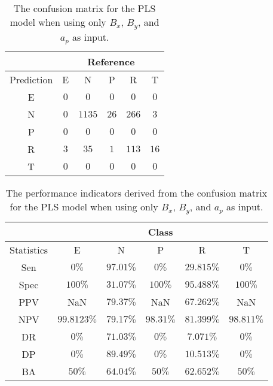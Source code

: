 \begin{table}[!ht]
	\centering
	\begin{tabular}{|c|c|c|c|c|c|}
		\hline
		 & \multicolumn{5}{|c|}{Reference} \\ \hline
		 Prediction & E & N & P & R & T \\ \hline
		 E & $0$ & $0$ & $0$ & $0$ & $0$ \\ \hline
		 N & $0$ & $1135$ & $26$ & $266$ & $3$ \\ \hline
		 P & $0$ & $0$ & $0$ & $0$ & $0$ \\ \hline
		 R & $3$ & $35$ & $1$ & $113$ & $16$ \\ \hline
		 T & $0$ & $0$ & $0$ & $0$ & $0$ \\ \hline
	\end{tabular}
	\caption{The confusion matrix for the PLS model when using only $B_{x}$, $B_{y}$, and $a_{p}$ as input.}
	\label{tab:cm:xyap:pls}
\end{table}

\begin{table}[!ht]
	\centering
	\begin{tabular}{|c|c|c|c|c|c|}
		\hline
		 & \multicolumn{5}{c|}{Class} \\ \hline
		Statistics & E & N & P & R & T \\ \hline
		Sen & $0\%$ & $97.01\%$ & $0\%$ & $29.815\%$ & $0\%$ \\ \hline
		Spec & $100\%$ & $31.07\%$ & $100\%$ & $95.488\%$ & $100\%$ \\ \hline
		PPV & NaN & $79.37\%$ & NaN & $67.262\%$ & NaN \\ \hline
		NPV & $99.8123\%$ & $79.17\%$ & $98.31\%$ & $81.399\%$ & $98.811\%$ \\ \hline
		DR & $0\%$ & $71.03\%$ & $0\%$ & $7.071\%$ & $0\%$ \\ \hline
		DP & $0\%$ & $89.49\%$ & $0\%$ & $10.513\%$ & $0\%$ \\ \hline
		BA & $50\%$ & $64.04\%$ & $50\%$ & $62.652\%$ & $50\%$ \\ \hline
	\end{tabular}
	\caption{The performance indicators derived from the confusion matrix for the PLS model when using only $B_{x}$, $B_{y}$, and $a_{p}$ as input.}
	\label{tab:cs:reverse:xyap:pls}
\end{table}

